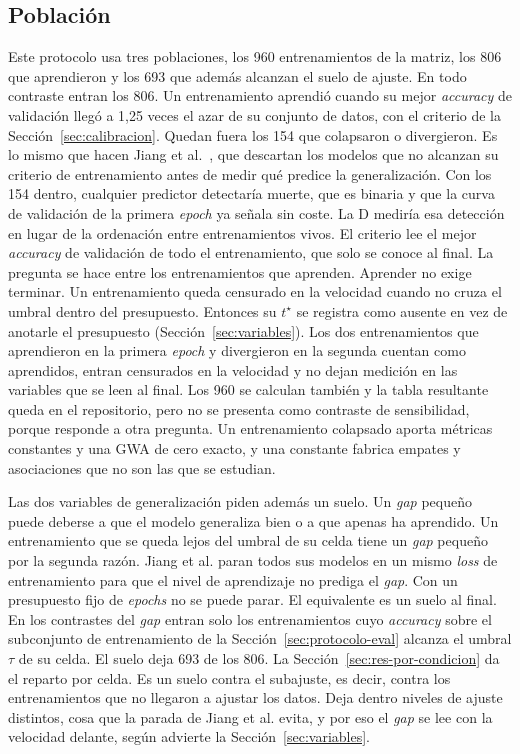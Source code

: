 \subsection{Población}
\label{sec:protocolo-poblacion}

Este protocolo usa tres poblaciones, los 960 entrenamientos de la matriz, los 806 que aprendieron y los 693 que además alcanzan el suelo de ajuste. En todo contraste entran los 806. Un entrenamiento aprendió cuando su mejor \emph{accuracy} de validación llegó a 1,25 veces el azar de su conjunto de datos, con el criterio de la Sección~\ref{sec:calibracion}. Quedan fuera los 154 que colapsaron o divergieron. Es lo mismo que hacen Jiang et al.~\cite{jiang2020fantastic}, que descartan los modelos que no alcanzan su criterio de entrenamiento antes de medir qué predice la generalización. Con los 154 dentro, cualquier predictor detectaría muerte, que es binaria y que la curva de validación de la primera \emph{epoch} ya señala sin coste. La D mediría esa detección en lugar de la ordenación entre entrenamientos vivos. El criterio lee el mejor \emph{accuracy} de validación de todo el entrenamiento, que solo se conoce al final. La pregunta se hace entre los entrenamientos que aprenden. Aprender no exige terminar. Un entrenamiento queda censurado en la velocidad cuando no cruza el umbral dentro del presupuesto. Entonces su $t^\star$ se registra como ausente en vez de anotarle el presupuesto (Sección~\ref{sec:variables}). Los dos entrenamientos que aprendieron en la primera \emph{epoch} y divergieron en la segunda cuentan como aprendidos, entran censurados en la velocidad y no dejan medición en las variables que se leen al final. Los 960 se calculan también y la tabla resultante queda en el repositorio, pero no se presenta como contraste de sensibilidad, porque responde a otra pregunta. Un entrenamiento colapsado aporta métricas constantes y una GWA de cero exacto, y una constante fabrica empates y asociaciones que no son las que se estudian.

Las dos variables de generalización piden además un suelo. Un \emph{gap} pequeño puede deberse a que el modelo generaliza bien o a que apenas ha aprendido. Un entrenamiento que se queda lejos del umbral de su celda tiene un \emph{gap} pequeño por la segunda razón. Jiang et al. paran todos sus modelos en un mismo \emph{loss} de entrenamiento para que el nivel de aprendizaje no prediga el \emph{gap}. Con un presupuesto fijo de \emph{epochs} no se puede parar. El equivalente es un suelo al final. En los contrastes del \emph{gap} entran solo los entrenamientos cuyo \emph{accuracy} sobre el subconjunto de entrenamiento de la Sección~\ref{sec:protocolo-eval} alcanza el umbral $\tau$ de su celda. El suelo deja 693 de los 806. La Sección~\ref{sec:res-por-condicion} da el reparto por celda. Es un suelo contra el subajuste, es decir, contra los entrenamientos que no llegaron a ajustar los datos. Deja dentro niveles de ajuste distintos, cosa que la parada de Jiang et al. evita, y por eso el \emph{gap} se lee con la velocidad delante, según advierte la Sección~\ref{sec:variables}.

